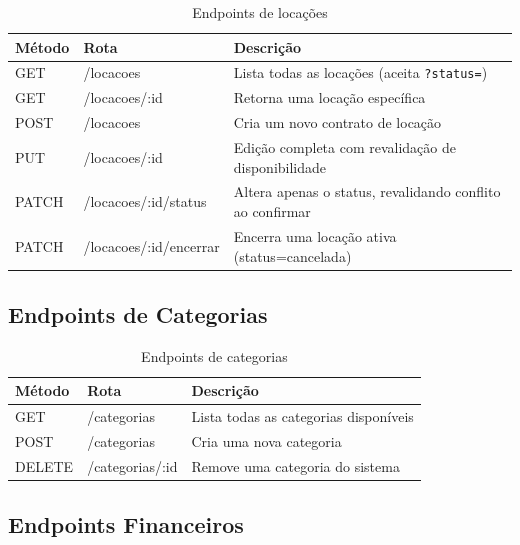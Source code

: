 \documentclass[12pt, a4paper]{article}
\newcommand{\thead}[1]{\cellcolor{tableheader}\color{white}\bfseries #1}
\newcommand{\talt}{\rowcolor{tablerowalt}}
\begin{document}
\begin{table}[H]
\centering
\begin{tabularx}{\textwidth}{|l|l|X|}
\hline
\thead{Método} & \thead{Rota} & \thead{Descrição} \\
\hline
GET   & /locacoes                 & Lista todas as locações (aceita \texttt{?status=}) \\
\talt GET   & /locacoes/:id             & Retorna uma locação específica \\
POST  & /locacoes                 & Cria um novo contrato de locação \\
\talt PUT   & /locacoes/:id             & Edição completa com revalidação de disponibilidade \\
PATCH & /locacoes/:id/status      & Altera apenas o status, revalidando conflito ao confirmar \\
\talt PATCH & /locacoes/:id/encerrar    & Encerra uma locação ativa (status=cancelada) \\
\hline
\end{tabularx}
\caption{Endpoints de locações}
\end{table}

\subsection{Endpoints de Categorias}

\begin{table}[H]
\centering
\begin{tabularx}{\textwidth}{|l|l|X|}
\hline
\thead{Método} & \thead{Rota} & \thead{Descrição} \\
\hline
GET    & /categorias     & Lista todas as categorias disponíveis \\
\talt POST   & /categorias     & Cria uma nova categoria \\
DELETE & /categorias/:id & Remove uma categoria do sistema \\
\hline
\end{tabularx}
\caption{Endpoints de categorias}
\end{table}

\subsection{Endpoints Financeiros}
\end{document}
